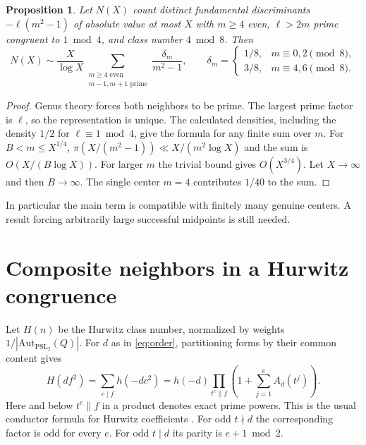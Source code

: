 \documentclass[11pt]{article}
\newtheorem{proposition}[theorem]{Proposition}
\begin{document}
\begin{proposition}
Let $N(X)$ count distinct fundamental discriminants
$-\ell(m^2-1)$ of absolute value at most $X$ with $m\ge4$ even,
$\ell>2m$ prime congruent to $1\bmod4$, and class number $4\bmod8$.
Then
\[
 N(X)\sim\frac X{\log X}
 \sum_{\substack{m\ge4\text{ even}\\m-1,m+1\text{ prime}}}
 \frac{\delta_m}{m^2-1},
 \qquad
 \delta_m=
 \begin{cases}
 1/8,&m\equiv0,2\pmod8,\\
 3/8,&m\equiv4,6\pmod8 .
 \end{cases}
\]
\end{proposition}
\begin{proof}
Genus theory forces both neighbors to be prime. The largest prime
factor is $\ell$, so the representation is unique. The calculated
densities, including the density $1/2$ for $\ell\equiv1\bmod4$, give
the formula for any finite sum over $m$. For $B<m\le X^{1/4}$,
$\pi(X/(m^2-1))\ll X/(m^2\log X)$ and the sum is
$O(X/(B\log X))$. For larger $m$ the trivial bound gives
$O(X^{3/4})$. Let $X\to\infty$ and then $B\to\infty$.
The single center $m=4$ contributes $1/40$ to the sum.
\end{proof}
In particular the main term is compatible with finitely many genuine
centers. A result forcing arbitrarily large successful midpoints is
still needed.

\section{Composite neighbors in a Hurwitz congruence}
Let $H(n)$ be the Hurwitz class number, normalized by weights
$1/|\mathrm{Aut}_{\mathrm{PSL}_2}(Q)|$. For $d$ as in
\eqref{eq:order}, partitioning forms by their common content gives
\begin{equation}\label{eq:hurwitz}
 H(df^2)=\sum_{c\mid f}h(-dc^2)
        =h(-d)\prod_{t^e\parallel f}
                 \left(1+\sum_{j=1}^e A_d(t^j)\right).
\end{equation}
Here and below $t^e\parallel f$ in a product denotes exact prime
powers. This is the usual conductor formula for Hurwitz coefficients
\cite{brr}. For odd $t\nmid d$ the corresponding factor is odd for
every $e$. For odd $t\mid d$ its parity is $e+1\bmod2$.
\end{document}

